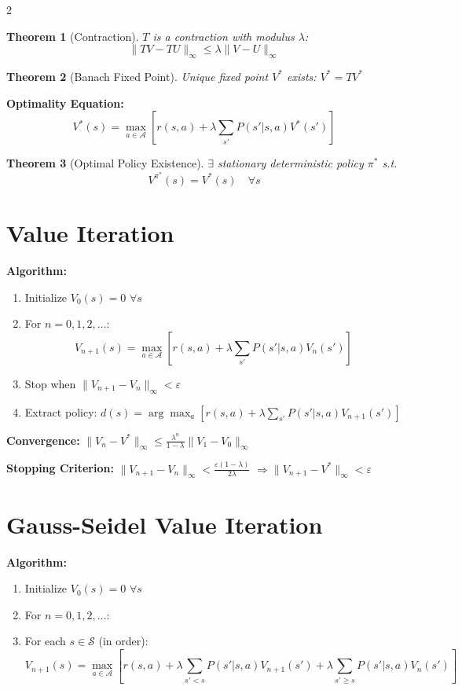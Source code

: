 \documentclass[8pt]{extarticle}
\newtheorem{theorem}{Theorem}
\begin{document}
\begin{multicols}{2}
\begin{theorem}[Contraction]
$T$ is a contraction with modulus $\lambda$:
$$\|TV - TU\|_\infty \leq \lambda \|V - U\|_\infty$$
\end{theorem}

\begin{theorem}[Banach Fixed Point]
Unique fixed point $V^*$ exists: $V^* = TV^*$
\end{theorem}

\textbf{Optimality Equation:}
$$V^*(s) = \max_{a \in \mathcal{A}} \left[r(s,a) + \lambda \sum_{s'} P(s'|s,a) V^*(s')\right]$$

\begin{theorem}[Optimal Policy Existence]
$\exists$ stationary deterministic policy $\pi^*$ s.t.
$$V^{\pi^*}(s) = V^*(s) \quad \forall s$$
\end{theorem}

\section*{\textcolor{algorithmgreen}{Value Iteration}}
\textbf{Algorithm:}
\begin{enumerate}[leftmargin=*]
    \item Initialize $V_0(s) = 0$ $\forall s$
    \item For $n = 0, 1, 2, \ldots$:
    $$V_{n+1}(s) = \max_{a \in \mathcal{A}} \left[r(s,a) + \lambda \sum_{s'} P(s'|s,a) V_n(s')\right]$$
    \item Stop when $\|V_{n+1} - V_n\|_\infty < \varepsilon$
    \item Extract policy: $d(s) = \arg\max_a [r(s,a) + \lambda \sum_{s'} P(s'|s,a) V_{n+1}(s')]$
\end{enumerate}

\textbf{Convergence:} $\|V_n - V^*\|_\infty \leq \frac{\lambda^n}{1-\lambda} \|V_1 - V_0\|_\infty$

\textbf{Stopping Criterion:} $\|V_{n+1} - V_n\|_\infty < \frac{\varepsilon(1-\lambda)}{2\lambda}$
$\Rightarrow \|V_{n+1} - V^*\|_\infty < \varepsilon$

\section*{\textcolor{algorithmgreen}{Gauss-Seidel Value Iteration}}
\textbf{Algorithm:}
\begin{enumerate}[leftmargin=*]
    \item Initialize $V_0(s) = 0$ $\forall s$
    \item For $n = 0, 1, 2, \ldots$:
    \item For each $s \in \mathcal{S}$ (in order):
    $$V_{n+1}(s) = \max_{a \in \mathcal{A}} \left[r(s,a) + \lambda \sum_{s'<s} P(s'|s,a) V_{n+1}(s') + \lambda \sum_{s'\geq s} P(s'|s,a) V_n(s')\right]$$
\end{enumerate}


\end{multicols}
\end{document}
